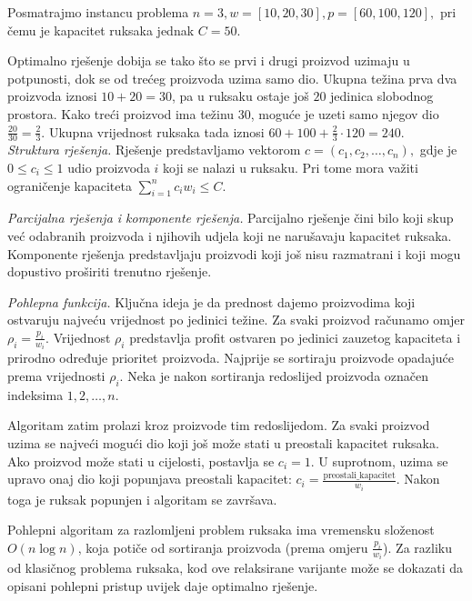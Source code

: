 \begin{solution}
	
	Posmatrajmo instancu problema $n=3,
	w=[10,20,30],
	p=[60,100,120],$ 	pri čemu je kapacitet ruksaka jednak $C=50$.
	
	Optimalno rješenje dobija se tako što se prvi i drugi proizvod uzimaju u potpunosti, dok se od trećeg proizvoda uzima samo dio. Ukupna težina prva dva proizvoda iznosi $10+20=30$, pa u ruksaku ostaje još $20$ jedinica slobodnog prostora. Kako treći proizvod ima težinu $30$, moguće je uzeti samo njegov dio $\frac{20}{30}=\frac{2}{3}.$  Ukupna vrijednost ruksaka tada iznosi 	$60 + 100 + \frac{2}{3}\cdot 120 = 240.$ \\
	\medskip
	\textit{Struktura rješenja.}	Rješenje predstavljamo vektorom $c=(c_1,c_2,\ldots,c_n),$ gdje je $0\leq c_i\leq 1$ udio proizvoda $i$ koji se nalazi u ruksaku. Pri tome mora važiti ograničenje kapaciteta $	\sum_{i=1}^{n} c_i w_i \leq C.$
	
	\medskip
	
	\textit{Parcijalna rješenja i komponente rješenja.}
	Parcijalno rješenje čini bilo koji skup već odabranih proizvoda i njihovih udjela koji ne narušavaju kapacitet ruksaka. Komponente rješenja predstavljaju proizvodi koji još nisu razmatrani i koji mogu dopustivo proširiti trenutno rješenje.
	
	\medskip
	
	\textit{Pohlepna funkcija.}
	Ključna ideja je da prednost dajemo proizvodima koji ostvaruju najveću vrijednost po jedinici težine. Za svaki proizvod računamo omjer $
	\rho_i=\frac{p_i}{w_i}.$  Vrijednost $\rho_i$ predstavlja profit ostvaren po jedinici zauzetog kapaciteta i prirodno određuje prioritet proizvoda. Najprije se sortiraju proizvode opadajuće prema vrijednosti $\rho_i$. Neka je nakon sortiranja redoslijed proizvoda označen indeksima $1,2,\ldots,n.$
	
	Algoritam zatim prolazi kroz proizvode tim redoslijedom. Za svaki proizvod uzima se najveći mogući dio koji još može stati u preostali kapacitet ruksaka. Ako proizvod može stati u cijelosti, postavlja se $c_i=1$. U suprotnom, uzima se upravo onaj dio koji popunjava preostali kapacitet: $c_i=  \frac{\text{preostali\_kapacitet}}{w_i}.$  Nakon toga je ruksak popunjen i algoritam se završava.
	
	\medskip
	
	Pohlepni algoritam za razlomljeni problem ruksaka ima vremensku složenost $O(n\log n)$, koja potiče od sortiranja proizvoda (prema omjeru $\frac{p_i}{w_i}$). Za razliku od klasičnog problema ruksaka, kod ove relaksirane varijante može se dokazati da opisani pohlepni pristup uvijek daje optimalno rješenje.
\end{solution}


